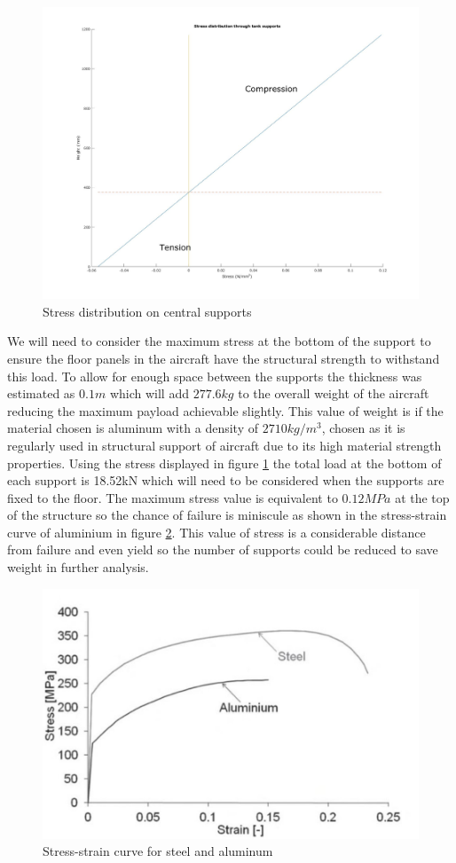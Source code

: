 \begin{figure}[!htbp]
\centering
\includegraphics[width= \linewidth]{../figures/stress_distribution_on_central_supports.jpg}
\caption{Stress distribution on central supports}
  \label{fig:stress_distribution_on_central_supports}
\end{figure}
\FloatBarrier

We will need to consider the maximum stress at the bottom of the support to ensure the floor panels in the aircraft have the structural strength to withstand this load. To allow for enough space between the supports the thickness was estimated as $0.1m$ which will add $277.6kg$ to the overall weight of the aircraft reducing the maximum payload achievable slightly. This value of weight is if the material chosen is aluminum with a density of $2710kg/m^3$, chosen as it is regularly used in structural support of aircraft due to its high material strength properties.
Using the stress displayed in figure \ref{fig:stress_distribution_on_central_supports} the total load at the bottom of each support is 18.52kN which will need to be considered when the supports are fixed to the floor.
The maximum stress value is equivalent to $0.12 MPa$ at the top of the structure so the chance of failure is miniscule as shown in the stress-strain curve of aluminium in figure \ref{fig:stress_strain_steel_al}. This value of stress is a considerable distance from failure and even yield so the number of supports could be reduced to save weight in further analysis. 

\begin{figure}[!htbp]
\centering
\includegraphics[width= \linewidth]{../figures/stress_strain_steel_al.jpg}
\caption{Stress-strain curve for steel and aluminum}
  \label{fig:stress_strain_steel_al}
\end{figure}
\FloatBarrier
